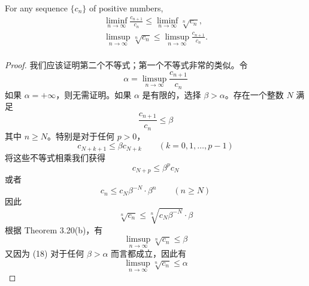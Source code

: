 \documentclass[../poma-notes.tex]{subfiles}
\begin{document}

\begin{theorem}
  For any sequence $\{c_n\}$ of positive numbers,
  \begin{gather*}
    \liminf_{n\to\infty}\frac{c_{n+1}}{c_n} \le \liminf_{n\to\infty}\sqrt[n]{c_n}, \\
    \limsup_{n\to\infty}\sqrt[n]{c_n} \le \limsup_{n\to\infty}\frac{c_{n+1}}{c_n}. \\
  \end{gather*}
\end{theorem}

\begin{proof}
  我们应该证明第二个不等式；第一个不等式非常的类似。令
  \[
    \alpha = \limsup_{n\to\infty} \frac{c_{n+1}}{c_n}
  \]
  如果 $\alpha = +\infty$，则无需证明。如果 $\alpha$ 是有限的，选择 $\beta > \alpha$。存在一个整数 $N$ 满足
  \[ \frac{c_{n+1}}{c_n} \le \beta \]
  其中 $n \ge N$。特别是对于任何 $p > 0$，
  \[ c_{N+k+1} \le \beta c_{N+k} \qquad (k=0,1,\dots,p-1) \]
  将这些不等式相乘我们获得
  \[ c_{N+p} \le \beta^p c_N \]
  或者
  \[ c_n \le c_N \beta^{-N} \cdot \beta^n \qquad (n \ge N) \]
  因此
  \[ \sqrt[n]{c_n} \le \sqrt[n]{c_N \beta^{-N}} \cdot \beta \]
  根据 Theorem 3.20(b)，有
  \begin{equation}
    \limsup_{n\to\infty} \sqrt[n]{c_n} \le \beta
  \end{equation}
  又因为 (18) 对于任何 $\beta > \alpha$ 而言都成立，因此有
  \[ \limsup_{n\to\infty} \sqrt[n]{c_n} \le \alpha \]
\end{proof}

\end{document}

